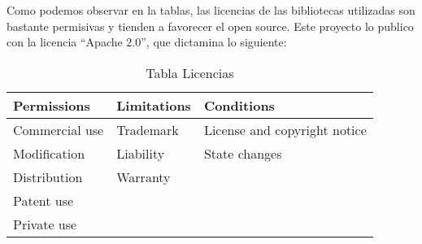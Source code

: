 Como podemos observar en la tablas, las licencias de las bibliotecas utilizadas son bastante permisivas y tienden a favorecer el open source.
Este proyecto lo publico con la licencia “Apache 2.0”, que dictamina lo siguiente:


\begin{table}[!h]
	\centering
	\begin{tabular}{l|l|l}
		\toprule
		Permissions & Limitations & Conditions  \\
		\midrule
		Commercial use & Trademark & License and copyright notice \\
		Modification & Liability & State changes \\
		Distribution & Warranty \\
		Patent use \\
		Private use \\
		\bottomrule
	\end{tabular}
	\caption{Tabla Licencias}
	\label{tab:licencia}
\end{table}
